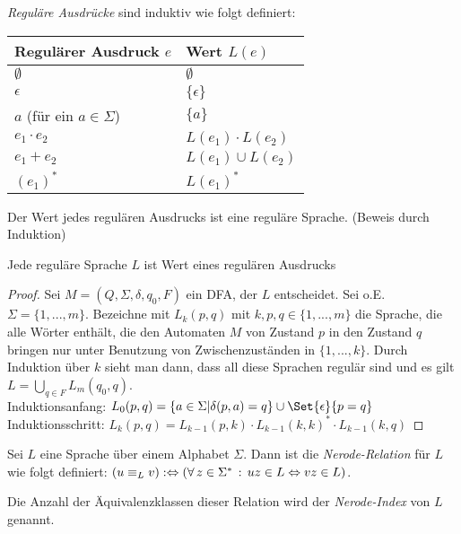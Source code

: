 \documentclass{cheat-sheet}
\begin{document}
\begin{definition}
\emph{Reguläre Ausdrücke} sind induktiv wie folgt definiert:

\begin{center}
\begin{tabular}{ l | l }
  Regulärer Ausdruck $e$ & Wert $L(e)$ \\
  \hline
  $\emptyset$ & $\emptyset$ \\
  $\epsilon$ & $\{\epsilon\}$ \\
  $a$ (für ein $a \in \Sigma$) & $\{ a \}$ \\
  $e_{1} \cdot e_{2}$ & $L(e_{1}) \cdot L(e_{2})$ \\
  $e_{1} + e_{2}$ & $L(e_{1}) \cup L(e_{2})$ \\
  $(e_{1})^{*}$ & $L(e_{1})^{*}$ \\
\end{tabular}
\end{center}

\end{definition}

\begin{satz}
Der Wert jedes regulären Ausdrucks ist eine reguläre Sprache. (Beweis durch Induktion)
\end{satz}

\begin{satz}
Jede reguläre Sprache $L$ ist Wert eines regulären Ausdrucks
\end{satz}

\begin{proof}
Sei $M = (Q, \Sigma, \delta, q_{0}, F)$ ein DFA, der $L$ entscheidet. Sei o.E. $\Sigma = \{ 1, ..., m \}$. Bezeichne mit $L_{k}(p, q)$ mit $k, p, q \in \{1, ..., m\}$ die Sprache, die alle Wörter enthält, die den Automaten $M$ von Zustand $p$ in den Zustand $q$ bringen nur unter Benutzung von Zwischenzuständen in $\{ 1, ..., k \}$. Durch Induktion über $k$ sieht man dann, dass all diese Sprachen regulär sind und es gilt $L = \bigcup_{q \in F} L_{m}(q_{0}, q)$.\\
Induktionsanfang: $L_{0}(p, q) = \{ a \in \Sigma | \delta(p, a) = q \} \cup \Set{\epsilon}{p = q}$ \\
Induktionsschritt: $L_{k}(p, q) = L_{k-1}(p, k) \cdot L_{k-1}(k, k)^{*} \cdot L_{k-1}(k, q)$
\end{proof}

\begin{definition}
Sei $L$ eine Sprache über einem Alphabet $\Sigma$. Dann ist die \emph{Nerode-Relation} für $L$ wie folgt definiert: $(u \equiv_{L} v) :\Leftrightarrow (\forall \, {z \in \Sigma^{*}} \,:\, uz \in L \Leftrightarrow vz \in L)$.

Die Anzahl der Äquivalenzklassen dieser Relation wird der \emph{Nerode-Index} von $L$ genannt.
\end{definition}
\end{document}
